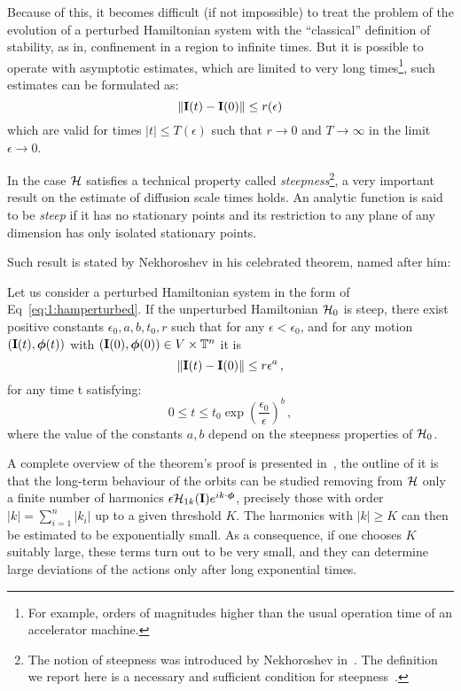Because of this, it becomes difficult (if not impossible) to treat the problem of the evolution of a perturbed Hamiltonian system with the ``classical'' definition of stability, as in, confinement in a region to infinite times. But it is possible to operate with asymptotic estimates, which are limited to very long times\footnote{For example, orders of magnitudes higher than the usual operation time of an accelerator machine.}, such estimates can be formulated as:
\begin{equation}
    \norm{\vb{I}(t)-\vb{I}(0)} \leq r(\epsilon)
\end{equation}
which are valid for times $|t| \leq T(\epsilon)$ such that $r \rightarrow 0$ and $T \rightarrow \infty$ in the limit $\epsilon \rightarrow 0$. 

In the case $\mathcal{H}$ satisfies a technical property called \textit{steepness}\footnote{The notion of steepness was introduced by Nekhoroshev in~\cite{N_N_Nehorošev_1973}. The definition we report here is a necessary and sufficient condition for steepness~\cite{AIF_2006__56_3_795_0}.}, a very important result on the estimate of diffusion scale times holds. An analytic function is said to be \textit{steep} if it has no stationary points and its restriction to any plane of any dimension has only isolated stationary points.

Such result is stated by Nekhoroshev in his celebrated theorem, named after him:
\begin{theorem}
    Let us consider a perturbed Hamiltonian system in the form of Eq~\eqref{eq:1:hamperturbed}. If the unperturbed Hamiltonian $\mathcal{H}_0$ is steep, there exist positive constants $\epsilon_0, a, b, t_0, r$ such that for any $\epsilon<\epsilon_0$, and for any motion $(\vb{I}(t), \boldsymbol{\phi}(t))$ with $(\vb{I}(0), \boldsymbol{\phi}(0)) \in V \times \mathbb{T}^n$ it is
    \begin{equation}
        \norm{\vb{I}(t)-\vb{I}(0)} \leq r \epsilon^a \,,
    \end{equation}
    for any time t satisfying:
    \begin{equation}
        0 \leq t \leq t_0 \exp \left(\frac{\epsilon_0}{\epsilon}\right)^b \,,  
    \end{equation}
    where the value of the constants $a, b$ depend on the steepness properties of $\mathcal{H}_0$.
\end{theorem}

A complete overview of the theorem's proof is presented in~\cite{Guzzo2007}, the outline of it is that the long-term behaviour of the orbits can be studied removing from $\mathcal{H}$ only a finite number of harmonics $\epsilon \mathcal{H}_{1k}(\vb{I}) e^{i k \cdot \boldsymbol{\phi}}$, precisely those with order $|k|=\sum_{i=1}^n\left|k_i\right|$ up to a given threshold $K$. The harmonics with $|k| \geq K$ can then be estimated to be exponentially small. As a consequence, if one chooses $K$ suitably large, these terms turn out to be very small, and they can determine large deviations of the actions only after long exponential times.

